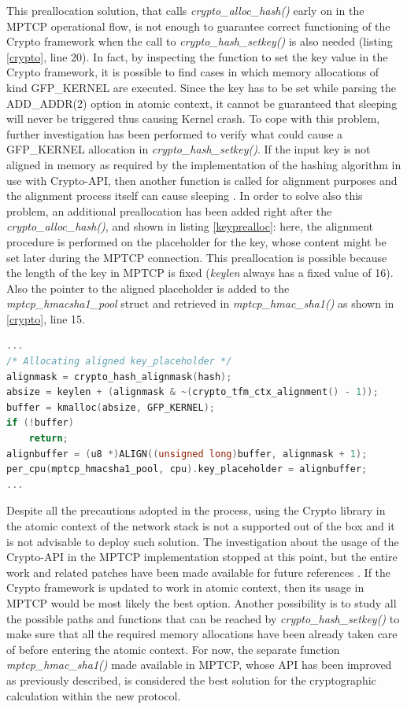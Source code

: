 This preallocation solution, that calls \textit{crypto\_alloc\_hash()} early on in the MPTCP operational flow, is not enough to guarantee correct functioning of the Crypto framework when the call to \textit{crypto\_hash\_setkey()} is also needed (listing \ref{crypto}, line 20). In fact, by inspecting the function to set the key value in the Crypto framework, it is possible to find cases in which memory allocations of kind GFP\_KERNEL are executed. Since the key has to be set while parsing the ADD\_ADDR(2) option in atomic context, it cannot be guaranteed that sleeping will never be triggered thus causing Kernel crash. To cope with this problem, further investigation has been performed to verify what could cause a GFP\_KERNEL allocation in \textit{crypto\_hash\_setkey()}. If the input key is not aligned in memory as required by the implementation of the hashing algorithm in use with Crypto-API, then another function \cite{shash61} is called for alignment purposes and the alignment process itself can cause sleeping \cite{shash43}. In order to solve also this problem, an additional preallocation has been added right after the  \textit{crypto\_alloc\_hash()}, and shown in listing \ref{keyprealloc}: here, the alignment procedure is performed on the placeholder for the key, whose content might be set later during the MPTCP connection. This preallocation is possible because the length of the key in MPTCP is fixed (\textit{keylen} always has a fixed value of 16).
Also the pointer to the aligned placeholder is added to the \textit{mptcp\_hmacsha1\_pool} struct and retrieved in \textit{mptcp\_hmac\_sha1()} as shown in \ref{crypto}, line 15.

\begin{lstlisting}[language=c, caption=Preallocating an aligned placeholder for the HMAC key, label=keyprealloc]
...
/* Allocating aligned key_placeholder */
alignmask = crypto_hash_alignmask(hash);
absize = keylen + (alignmask & ~(crypto_tfm_ctx_alignment() - 1));
buffer = kmalloc(absize, GFP_KERNEL);
if (!buffer)
	return;
alignbuffer = (u8 *)ALIGN((unsigned long)buffer, alignmask + 1);
per_cpu(mptcp_hmacsha1_pool, cpu).key_placeholder = alignbuffer;
...
\end{lstlisting}

Despite all the precautions adopted in the process, using the Crypto library in the atomic context of the network stack is not a supported out of the box and it is not advisable to deploy such solution. The investigation about the usage of the Crypto-API in the MPTCP implementation stopped at this point, but the entire work and related patches have been made available for future references \cite{cryptopatch1} \cite{cryptopatch2}. If the Crypto framework is updated to work in atomic context, then its usage in MPTCP would be most likely the best option. Another possibility is to study all the possible paths and functions that can be reached by \textit{crypto\_hash\_setkey()} to make sure that all the required memory allocations have been already taken care of before entering the atomic context. For now, the separate function \textit{mptcp\_hmac\_sha1()} made available in MPTCP, whose API has been improved as previously described, is considered the best solution for the cryptographic calculation within the new protocol.

